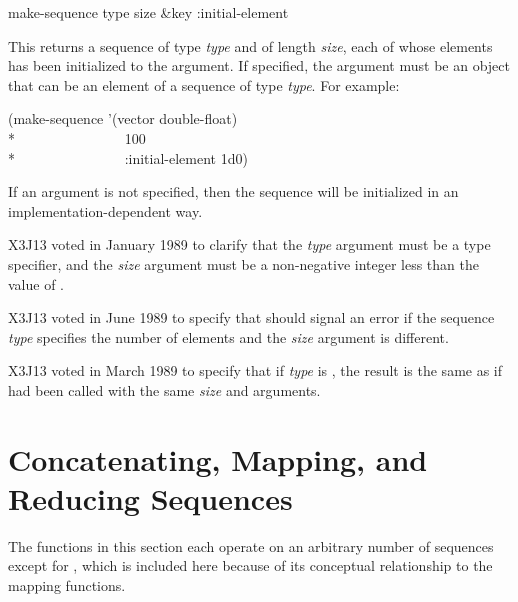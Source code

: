 \begin{defun}[Function]
make-sequence type size &key :initial-element

This returns a sequence of type {\it type} and of length {\it size}, each of
whose elements
has been initialized to the  argument.
If specified, the  argument must be an object that
can be an element of a sequence of type {\it type}.
For example:
\begin{lisp}
(make-sequence '(vector double-float) \\*
~~~~~~~~~~~~~~~100 \\*
~~~~~~~~~~~~~~~:initial-element 1d0)
\end{lisp}
If an  argument is not specified, then the sequence will
be initialized in an implementation-dependent way.

\begin{new}
X3J13 voted in January 1989
to clarify that the {\it type} argument
must be a type specifier, and the {\it size} argument
must be a non-negative integer less than the value of
.
\end{new}

\begin{newer}
X3J13 voted in June 1989  to specify that
 should signal an error if the sequence {\it type} specifies the
number of elements and the {\it size} argument is different.
\end{newer}

\begin{newer}
X3J13 voted in March 1989 
to specify that if {\it type} is , the result is the same
as if  had been called with the same {\it size}
and  arguments.
\end{newer}
\end{defun}

\section{Concatenating, Mapping, and Reducing Sequences}

The functions in this section each operate on an arbitrary number of
sequences except for , which is included here because
of its conceptual relationship to the mapping functions.

